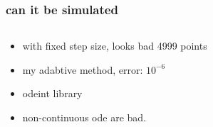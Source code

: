 \documentclass{beamer}
\begin{document}
\begin{frame}
\frametitle{can it be simulated}
\begin{columns}
\begin{column}{0.5\linewidth}
\begin{itemize}
\item<1-> with fixed step size, looks bad 4999 points

\item<2- > my adabtive method, error: $10^{-6}$

\item<3-> odeint library

\item<4-> non-continuous ode are bad.

\end{itemize}
\end{column}
\begin{column}{0.5\linewidth}
\end{column}
\end{columns}
\end{frame}
\end{document}
